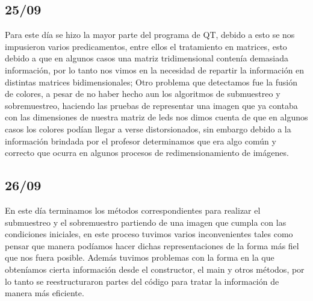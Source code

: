 \documentclass{article}
\begin{document}
    \begin{flushleft}
     \subsection{25/09}
     Para este día se hizo la mayor parte del programa de QT, debido a esto se nos impusieron varios predicamentos, entre ellos el tratamiento en matrices, esto debido a que en algunos casos una matriz tridimensional contenía demasiada información, por lo tanto nos vimos en la necesidad de repartir la información en distintas matrices bidimensionales; Otro problema que detectamos fue la fusión de colores, a pesar de no haber hecho aun los algoritmos de submuestreo y sobremuestreo, haciendo las pruebas de representar una imagen que ya contaba con las dimensiones de nuestra matriz de leds nos dimos cuenta de que en algunos casos los colores podían llegar a verse distorsionados, sin embargo debido a la información brindada por el profesor determinamos que era algo común y correcto que ocurra en algunos procesos de redimensionamiento de imágenes.
     
     
     \subsection{26/09}   
     En este día terminamos los métodos correspondientes para realizar el submuestreo y el sobremuestro partiendo de una imagen que cumpla con las condiciones iniciales, en este proceso tuvimos varios inconvenientes tales como pensar que manera podíamos hacer dichas representaciones de la forma más fiel que nos fuera posible. Además tuvimos problemas con la forma en la que obteníamos cierta información desde el constructor, el main y otros métodos, por lo tanto se reestructuraron partes del código para tratar la información de manera más eficiente.  
     
    \end{flushleft}
    
   \newpage
    
\end{document}
